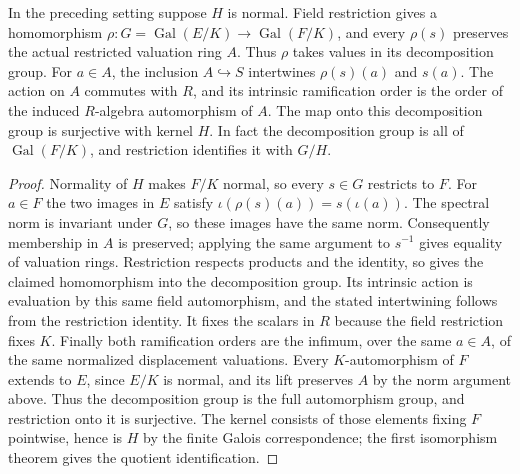 \begin{lemma}
\label{fw:fixed-field-restriction}
\leanok
In the preceding setting suppose $H$ is normal. Field restriction gives
a homomorphism $\rho:G=\operatorname{Gal}(E/K)\to\operatorname{Gal}(F/K)$,
and every $\rho(s)$ preserves the actual restricted valuation ring $A$.
Thus $\rho$ takes values in its decomposition group. For $a\in A$,
the inclusion $A\hookrightarrow S$ intertwines $\rho(s)(a)$ and $s(a)$.
The action on $A$ commutes with $R$, and its intrinsic ramification
order is the order of the induced $R$-algebra automorphism of $A$.
The map onto this decomposition group is surjective with kernel $H$.
In fact the decomposition group is all of $\operatorname{Gal}(F/K)$,
and restriction identifies it with $G/H$.
\end{lemma}
\begin{proof}
Normality of $H$ makes $F/K$ normal, so every $s\in G$ restricts to $F$.
For $a\in F$ the two images in $E$ satisfy
$\iota(\rho(s)(a))=s(\iota(a))$. The spectral norm is invariant under
$G$, so these images have the same norm. Consequently membership in
$A$ is preserved; applying the same argument to $s^{-1}$ gives equality
of valuation rings. Restriction respects products and the identity,
so gives the claimed homomorphism into the decomposition group.
Its intrinsic action is evaluation by this same field automorphism,
and the stated intertwining follows from the restriction identity.
It fixes the scalars in $R$ because the field restriction fixes $K$.
Finally both ramification orders are the infimum, over the same
$a\in A$, of the same normalized displacement valuations.
Every $K$-automorphism of $F$ extends to $E$, since $E/K$ is normal,
and its lift preserves $A$ by the norm argument above. Thus the
decomposition group is the full automorphism group, and restriction
onto it is surjective. The kernel consists of those elements fixing
$F$ pointwise, hence is $H$ by the finite Galois correspondence;
the first isomorphism theorem gives the quotient identification.
\end{proof}

